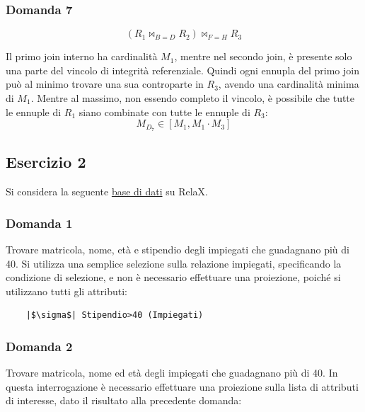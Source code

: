 \documentclass{article}
\numberwithin{equation}{subsection}
\begin{document}
\subsubsection*{Domanda 7}

\begin{equation*}
    (R_1\Join_{B=D}R_2)\Join_{F=H}R_3
\end{equation*}

Il primo join interno ha cardinalità $M_1$, mentre nel secondo join, è presente solo una parte del vincolo di integrità referenziale. Quindi ogni ennupla del primo join può al minimo 
trovare una sua controparte in $R_3$, avendo una cardinalità minima di $M_1$. Mentre al massimo, non essendo completo il vincolo, è possibile che tutte le ennuple di $R_1$ siano combinate 
con tutte le ennuple di $R_3$:
\begin{equation}
    M_{D_7}\in[M_1,M_1\cdot M_3]
\end{equation}

\subsection{Esercizio 2}

Si considera la seguente \href{https://dbis-uibk.github.io/relax/calc/gist/b7a8eac38317e0d6a7f0b904a9a10bd3}{base di dati} su RelaX.


\subsubsection*{Domanda 1}

Trovare matricola, nome, età e stipendio degli impiegati che guadagnano più di 40. Si utilizza una semplice selezione sulla relazione impiegati, specificando la condizione di selezione, e non è necessario 
effettuare una proiezione, poiché si utilizzano tutti gli attributi: 

\begin{verbatim}
    |$\sigma$| Stipendio>40 (Impiegati)
\end{verbatim}

\subsubsection*{Domanda 2}

Trovare matricola, nome ed età degli impiegati che guadagnano più di 40. In questa interrogazione è necessario effettuare una proiezione sulla lista di attributi di interesse, dato il risultato alla precedente 
domanda:
\end{document}
